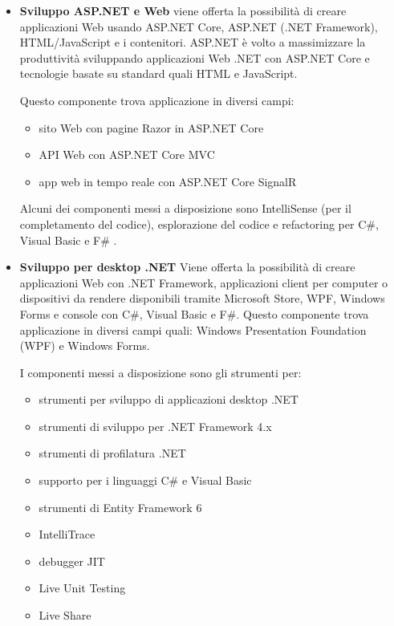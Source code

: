 \begin{itemize}
\item
\textbf{Sviluppo ASP.NET e Web}
viene offerta la possibilità di creare applicazioni Web usando ASP.NET Core, ASP.NET (.NET Framework), HTML/JavaScript e i contenitori. ASP.NET è volto a massimizzare la produttività sviluppando applicazioni Web .NET con ASP.NET Core e tecnologie basate su standard quali HTML e JavaScript.

Questo componente trova applicazione in diversi campi:
\begin{itemize}
\item 
sito Web con pagine Razor in ASP.NET Core
\item 
API Web con ASP.NET Core MVC
\item 
app web in tempo reale con ASP.NET Core SignalR
\end{itemize}
Alcuni dei componenti messi a disposizione sono IntelliSense (per il completamento del codice), esplorazione del codice e refactoring per C\#, Visual Basic e F\# \cite{VS}.
\item
\textbf{Sviluppo per desktop .NET}
Viene offerta la possibilità di creare applicazioni Web con .NET Framework, applicazioni client per computer o dispositivi da rendere disponibili tramite Microsoft Store, WPF, Windows Forms e console con C\#, Visual Basic e F\#. Questo componente trova applicazione in diversi campi quali: Windows Presentation Foundation (WPF) e Windows Forms.

I componenti messi a disposizione sono gli strumenti per:
\begin{itemize}
\item
strumenti per sviluppo di applicazioni desktop .NET
\item
strumenti di sviluppo per .NET Framework 4.x
\item
strumenti di profilatura .NET
\item
supporto per i linguaggi C\# e Visual Basic
\item
strumenti di Entity Framework 6
\item
IntelliTrace
\item
debugger JIT
\item
Live Unit Testing
\item
Live Share
\end{itemize}
\end{itemize}

